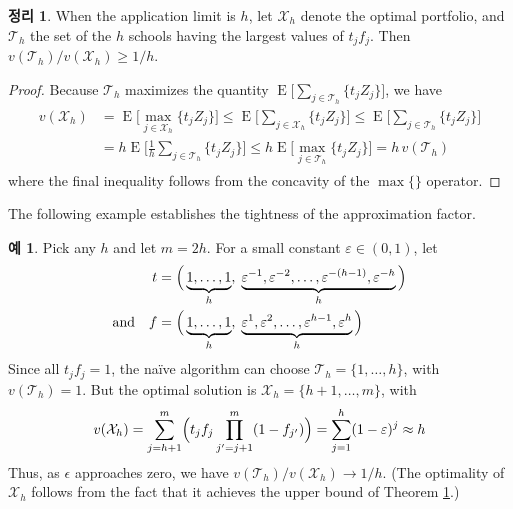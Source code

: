 \documentclass[12pt]{article} %
\newtheorem{theorem}{Theorem}
\theoremstyle{definition}
\newtheorem{example}{Example}
\newtheorem{theorem}{정리}
\theoremstyle{definition}
\newtheorem{example}{예}
\begin{document}
\begin{theorem} \label{oneoverhopt}
When the application limit is $h$, let $\mathcal{X}_h$ denote the optimal portfolio, and $\mathcal{T}_h$ the set of the $h$ schools having the largest values of $t_j f_j$. Then $v(\mathcal{T}_h) / v(\mathcal{X}_h) \geq 1/h$. 
\end{theorem}
\begin{proof}
Because $\mathcal{T}_h$ maximizes the quantity $\operatorname{E}\bigl[ \sum_{j \in \mathcal{T}_h}\{ t_j Z_j \}\bigr]$, we have
\begin{align} \label{oneoverhopt}
\begin{split}
v(\mathcal{X}_h) &= \operatorname{E}\bigl[ \max_{j \in \mathcal{X}_h}\{ t_j Z_j \}\bigr] \leq \operatorname{E}\bigl[ \sum_{j \in \mathcal{X}_h}\{ t_j Z_j \}\bigr] \leq \operatorname{E}\bigl[ \sum_{j \in \mathcal{T}_h}\{ t_j Z_j \}\bigr] \\
&= h  \operatorname{E}\bigl[ \tfrac{1}{h} \sum_{j \in \mathcal{T}_h}\{ t_j Z_j \}\bigr]
\leq h  \operatorname{E}\bigl[ \max_{j \in \mathcal{T}_h}\{ t_j Z_j \}\bigr]
= h\,v(\mathcal{T}_h)
\end{split}
\end{align}
where the final inequality follows from the concavity of the $\max\{\}$ operator.
\end{proof}

The following example establishes the tightness of the approximation factor. 

\begin{example} \label{tightexampleforoneoverhopt}
Pick any $h$ and let $m = 2h$. For a small constant $\varepsilon \in (0, 1)$, let
\begin{align*}
t &= \Bigl(\,\underbrace{1,  \dots, 1}_{h},\;
\underbrace{\varepsilon^{-1}, \varepsilon^{-2}, \dots, \varepsilon^{-(h-1)}, \varepsilon^{-h}}_{h}\,\Bigr) \\
\text{and}\quad f &= \Bigl(\,\underbrace{1,  \dots, 1}_{h},\;
\underbrace{\varepsilon^{1}, \varepsilon^{2}, \dots, \varepsilon^{h-1}, \varepsilon^{h}}_{h}\,\Bigr)
\end{align*}
Since all $t_j f_j = 1$, the na\"ive algorithm can choose $\mathcal{T}_h = \{1, \dots, h\}$, with $v(\mathcal{T}_h) = 1$. But the optimal solution is $\mathcal{X}_h = \{h+1, \dots, m\}$, with
\begin{equation*}
v(\mathcal{X}_h) = \sum_{j= h +1}^m \Bigl( t_j f_j \prod_{j' = j+1}^m (1 - f_{j'}) \Bigr) =  \sum_{j= 1}^h  (1 - \varepsilon)^{j} \approx h
\end{equation*}
Thus, as $\epsilon$ approaches zero, we have $v(\mathcal{T}_h) / v(\mathcal{X}_h) \to 1/h$. (The optimality of $\mathcal{X}_h$ follows from the fact that it achieves the upper bound of Theorem \ref{oneoverhopt}.)
\end{example}
\end{document}
